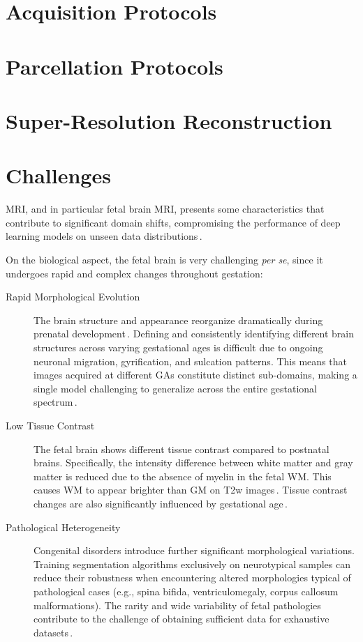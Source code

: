 \section{Acquisition Protocols}

\section{Parcellation Protocols}

\section{Super-Resolution Reconstruction} \label{sec:SuperResolutionReconstruction}

\section{Challenges} \label{sec:Challenges}
MRI, and in particular fetal brain MRI, presents some characteristics that contribute to significant domain shifts, compromising the performance of deep learning models on unseen data distributions\,\cite{FeTA2024_paper, FeTA2024_review}.

On the biological aspect, the fetal brain is very challenging \textit{per se}, since it undergoes rapid and complex changes throughout gestation:
\begin{description}
    \item[Rapid Morphological Evolution] The brain structure and appearance reorganize dramatically during prenatal development\,\cite{FeTA2024_paper, Ciceri2023}. Defining and consistently identifying different brain structures across varying gestational ages is difficult due to ongoing neuronal migration, gyrification, and sulcation patterns. This means that images acquired at different GAs constitute distinct sub-domains, making a single model challenging to generalize across the entire gestational spectrum\,\cite{Ciceri2024}.
    \item[Low Tissue Contrast] The fetal brain shows different tissue contrast compared to postnatal brains. Specifically, the intensity difference between white matter and gray matter is reduced due to the absence of myelin in the fetal WM. This causes WM to appear brighter than GM on T2w images\,\cite{Ciceri2023}. Tissue contrast changes are also significantly influenced by gestational age\,\cite{FeTA2024_paper}.
    \item[Pathological Heterogeneity] Congenital disorders introduce further significant morphological variations. Training segmentation algorithms exclusively on neurotypical samples can reduce their robustness when encountering altered morphologies typical of pathological cases (e.g., spina bifida, ventriculomegaly, corpus callosum malformations). The rarity and wide variability of fetal pathologies contribute to the challenge of obtaining sufficient data for exhaustive datasets\,\cite{FeTA2024_paper, FeTA2024_review}.
\end{description}


